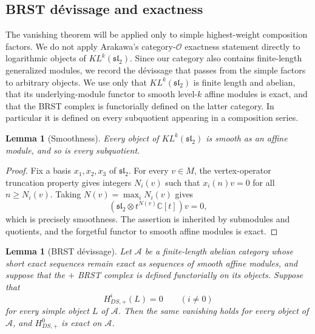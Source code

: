 \documentclass[12pt,leqno]{amsart}
\numberwithin{equation}{section}
\newtheorem{lem}[thm]{Lemma}
\newcommand{\KL}{KL}
\def\C{\mathbb{C}}
\begin{document}
\subsection{BRST d\'evissage and exactness}

The vanishing theorem will be applied only to simple highest-weight
composition factors.  We do not apply Arakawa's category-$\mathcal O$
exactness statement directly to logarithmic objects of
$\KL^k(\mathfrak{sl}_2)$.  Since our category also contains finite-length generalized modules, we
record the d\'evissage that passes from the simple factors to arbitrary
objects.  We use only that $\KL^k(\mathfrak{sl}_2)$ is finite length and
abelian, that its underlying-module functor to smooth level-$k$ affine modules
is exact, and that the BRST complex is functorially
defined on the latter category.  In particular it is defined on every
subquotient appearing in a composition series.

\begin{lem}[Smoothness]\label{lem:KL-smooth}
Every object of $\KL^k(\mathfrak{sl}_2)$ is smooth as an affine module, and
so is every subquotient.
\end{lem}

\begin{proof}
Fix a basis $x_1,x_2,x_3$ of $\mathfrak{sl}_2$.  For every
$v\in M$, the vertex-operator truncation property gives integers
$N_i(v)$ such that $x_i(n)v=0$ for all $n\ge N_i(v)$.  Taking
$N(v)=\max_iN_i(v)$ gives
\[
 (\mathfrak{sl}_2\otimes t^{N(v)}\C[t])v=0,
\]
which is precisely smoothness.  The assertion is inherited by submodules
and quotients, and the forgetful functor to smooth affine modules is
exact.
\end{proof}

\begin{lem}[BRST d\'evissage]\label{lem:BRST-devissage}
Let $\mathscr A$ be a finite-length abelian category whose short exact
sequences remain exact as sequences of smooth affine modules, and suppose that the
$+$ BRST complex is defined functorially on its objects.
Suppose that
\[
 H^i_{DS,+}(L)=0\qquad(i\neq0)
\]
for every simple object $L$ of $\mathscr A$.  Then the same vanishing holds
for every object of $\mathscr A$, and $H^0_{DS,+}$ is exact on
$\mathscr A$.
\end{lem}
\end{document}
